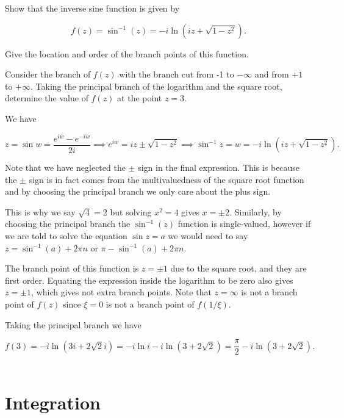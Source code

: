 \documentclass[english,a4paper,12pt]{report}
\begin{document}
{Show that the inverse sine function is given by 

\begin{equation}
    f(z) = \sin ^{-1} (z) = -i \ln (iz + \sqrt{1-z^2}). 
\end{equation}

Give the location and order of the branch points of this function.

Consider the branch of \(f(z)\) with the branch cut from -1 to \(-\infty\) and from \(+1\) to \(+\infty\). Taking the principal branch of the logarithm and the square root, determine the value of \(f(z)\) at the point \(z = 3\).       
}
{We have

\begin{equation}
    z = \sin w = \frac{e^{iw}-e^{-iw}  }{2i} \implies e^{iw} = iz \pm \sqrt{1-z^2} \implies \sin ^{-1} z = w = -i \ln (iz + \sqrt{1-z^2} ). \label{sin}  
\end{equation}

Note that we have neglected the \(\pm \) sign in the final expression. This is because the \(\pm \) sign is in fact comes from the multivaluedness of the square root function and by choosing the principal branch we only care about the plus sign. 

This is why we say \(\sqrt{4} =2 \) but solving \(x^2=4\) gives \(x = \pm 2\). Similarly, by choosing the principal branch the \(\sin ^{-1} (z)\) function is single-valued, however if we are told to solve the equation \(\sin z = a\) we would need to say \(z = \sin ^{-1} (a) + 2\pi n \text { or } \pi -\sin ^{-1} (a) + 2\pi n\).   

The branch point of this function is \(z = \pm 1\) due to the square root, and they are first order. Equating the expression inside the logarithm to be zero also gives \(z = \pm 1\), which gives not extra branch points. Note that \(z = \infty\) is not a branch point of \(f(z)\) since \(\xi = 0\) is not a branch point of \(f(1 /\xi )\).

Taking the principal branch we have 

\begin{equation}
    f(3) = -i \ln (3i +2\sqrt{2}i ) = -i \ln i - i \ln (3+2\sqrt{2} ) = \frac{\pi }{2} - i \ln (3+2 \sqrt{2} ). 
\end{equation}
~
} 



\section{Integration}
\end{document}
